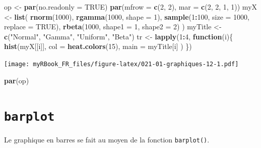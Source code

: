 \documentclass[
]{book}
\newenvironment{Shaded}{\begin{snugshade}}{\end{snugshade}}
\newcommand{\ControlFlowTok}[1]{\textcolor[rgb]{0.13,0.29,0.53}{\textbf{#1}}}
\newcommand{\DataTypeTok}[1]{\textcolor[rgb]{0.13,0.29,0.53}{#1}}
\newcommand{\DecValTok}[1]{\textcolor[rgb]{0.00,0.00,0.81}{#1}}
\newcommand{\KeywordTok}[1]{\textcolor[rgb]{0.13,0.29,0.53}{\textbf{#1}}}
\newcommand{\NormalTok}[1]{#1}
\newcommand{\OperatorTok}[1]{\textcolor[rgb]{0.81,0.36,0.00}{\textbf{#1}}}
\newcommand{\OtherTok}[1]{\textcolor[rgb]{0.56,0.35,0.01}{#1}}
\newcommand{\StringTok}[1]{\textcolor[rgb]{0.31,0.60,0.02}{#1}}
\begin{document}
\begin{Shaded}
\begin{Highlighting}[]
\NormalTok{op <-}\StringTok{ }\KeywordTok{par}\NormalTok{(}\DataTypeTok{no.readonly =} \OtherTok{TRUE}\NormalTok{)}
\KeywordTok{par}\NormalTok{(}\DataTypeTok{mfrow =} \KeywordTok{c}\NormalTok{(}\DecValTok{2}\NormalTok{, }\DecValTok{2}\NormalTok{), }\DataTypeTok{mar =} \KeywordTok{c}\NormalTok{(}\DecValTok{2}\NormalTok{, }\DecValTok{2}\NormalTok{, }\DecValTok{1}\NormalTok{, }\DecValTok{1}\NormalTok{))}
\NormalTok{myX <-}\StringTok{ }\KeywordTok{list}\NormalTok{(}
  \KeywordTok{rnorm}\NormalTok{(}\DecValTok{1000}\NormalTok{),}
  \KeywordTok{rgamma}\NormalTok{(}\DecValTok{1000}\NormalTok{, }\DataTypeTok{shape =} \DecValTok{1}\NormalTok{),}
  \KeywordTok{sample}\NormalTok{(}\DecValTok{1}\OperatorTok{:}\DecValTok{100}\NormalTok{, }\DataTypeTok{size =} \DecValTok{1000}\NormalTok{, }\DataTypeTok{replace =} \OtherTok{TRUE}\NormalTok{),}
  \KeywordTok{rbeta}\NormalTok{(}\DecValTok{1000}\NormalTok{, }\DataTypeTok{shape1 =} \DecValTok{1}\NormalTok{, }\DataTypeTok{shape2 =} \DecValTok{2}\NormalTok{)}
\NormalTok{)}
\NormalTok{myTitle <-}\StringTok{ }\KeywordTok{c}\NormalTok{(}\StringTok{"Normal"}\NormalTok{, }\StringTok{"Gamma"}\NormalTok{, }\StringTok{"Uniform"}\NormalTok{, }\StringTok{"Beta"}\NormalTok{)}
\NormalTok{tr <-}\StringTok{ }\KeywordTok{lapply}\NormalTok{(}\DecValTok{1}\OperatorTok{:}\DecValTok{4}\NormalTok{, }\ControlFlowTok{function}\NormalTok{(i)\{}
  \KeywordTok{hist}\NormalTok{(myX[[i]], }
    \DataTypeTok{col =} \KeywordTok{heat.colors}\NormalTok{(}\DecValTok{15}\NormalTok{), }
    \DataTypeTok{main =}\NormalTok{ myTitle[i]}
\NormalTok{  )}
\NormalTok{\})}
\end{Highlighting}
\end{Shaded}

\texttt{[image: myRBook\_FR\_files/figure-latex/021-01-graphiques-12-1.pdf]}

\begin{Shaded}
\begin{Highlighting}[]
\KeywordTok{par}\NormalTok{(op)}
\end{Highlighting}
\end{Shaded}

\hypertarget{graph1barplot}{%
\section{\texorpdfstring{\texttt{barplot}}{barplot}}\label{graph1barplot}}

Le graphique en barres se fait au moyen de la fonction \texttt{barplot()}.
\end{document}
